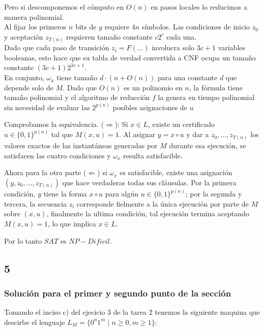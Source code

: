 Pero si descomponemos el cómputo en $O(n)$ en pasos locales lo reducimos a manera polinomial. \\   

Al fijar los primeros $n$ bits de $y$ requiere $4n$ símbolos.  Las condiciones de inicio $z_0$ y aceptación $z_{T(n)}$ requieren tamaño constante $c2^c$ cada una.\\

Dado que cada paso de transición $z_i = F(\dots)$ involucra solo $3c + 1$ variables booleanas, esto hace que su tabla de verdad convertida a CNF ocupa un tamaño constante $(3c+1)2^{3c+1}$. \\

En conjunto, $\omega_x$ tiene tamaño $d \cdot (n + O(n))$ para una constante $d$ que depende solo de $M$. Dado que $O(n)$ es un polinomio en $n$, la fórmula tiene tamaño polinomial y el algoritmo de reducción $f$ la genera en tiempo polinomial sin necesidad de evaluar las $2^{p(n)}$ posibles asignaciones de $u$

    Comprobamos la equivalencia. ($\Rightarrow$): Si $x \in L$, existe un certificado $u \in \{0,1\}^{p(n)}$ tal que $M(x,u) = 1$. Al asignar $y = x \circ u$ y dar a $z_0, \dots, z_{T(n)}$ los valores exactos de las instantáneas generadas por $M$ durante esa ejecución, se satisfacen las cuatro condiciones y $\omega_x$ resulta satisfacible.
    
    Ahora para la otra parte  ($\Leftarrow$) si $\omega_x$ es satisfacible, existe una asignación $(y, z_0, \dots, z_{T(n)})$ que hace verdaderas todas sus cláusulas. Por la primera condición, $y$ tiene la forma $x \circ u$ para algún $u \in \{0,1\}^{p(n)}$; por la segunda y tercera, la secuencia $z_i$ corresponde fielmente a la única ejecución por parte de  $M$ sobre $(x, u)$, finalmente la ultima condición, tal   ejecución termina aceptando $M(x,u) = 1$, lo que implica $x \in L$.

    Por lo tanto $SAT$ es $NP-Dificil$.
    \cite{SinhaChaturvedi2014}
\subsection{5}
\subsubsection*{Solución para el primer y segundo punto de la sección} 
Tomando el inciso c) del ejecicio 3 de la tarea 2 tenemos la siguiente maquina que descirbe el lenguaje \( L_M = \{0^n 1^m \mid n \geq 0, m \geq 1\} \): 

